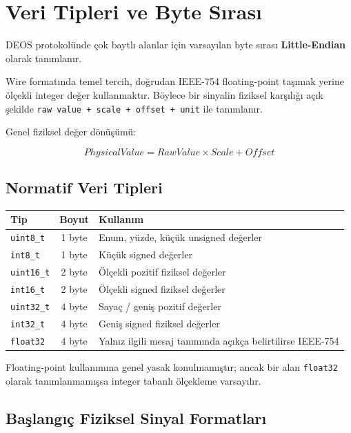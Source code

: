 \documentclass[a4paper,10pt]{article}
\newcommand{\code}[1]{\texttt{#1}}
\begin{document}
\section{Veri Tipleri ve Byte Sırası}

DEOS protokolünde çok baytlı alanlar için varsayılan byte sırası \textbf{Little-Endian}
olarak tanımlanır.

Wire formatında temel tercih, doğrudan IEEE-754 floating-point taşımak yerine ölçekli
integer değer kullanmaktır. Böylece bir sinyalin fiziksel karşılığı açık şekilde
\code{raw value + scale + offset + unit} ile tanımlanır.

Genel fiziksel değer dönüşümü:

\[
PhysicalValue = RawValue \times Scale + Offset
\]

\subsection{Normatif Veri Tipleri}

\begin{center}
\begin{tabularx}{\textwidth}{l c X}
\toprule
Tip & Boyut & Kullanım \\
\midrule
\code{uint8\_t}  & 1 byte & Enum, yüzde, küçük unsigned değerler \\
\code{int8\_t}   & 1 byte & Küçük signed değerler \\
\code{uint16\_t} & 2 byte & Ölçekli pozitif fiziksel değerler \\
\code{int16\_t}  & 2 byte & Ölçekli signed fiziksel değerler \\
\code{uint32\_t} & 4 byte & Sayaç / geniş pozitif değerler \\
\code{int32\_t}  & 4 byte & Geniş signed fiziksel değerler \\
\code{float32}   & 4 byte & Yalnız ilgili mesaj tanımında açıkça belirtilirse IEEE-754 \\
\bottomrule
\end{tabularx}
\end{center}

Floating-point kullanımına genel yasak konulmamıştır; ancak bir alan \code{float32}
olarak tanımlanmamışsa integer tabanlı ölçekleme varsayılır.

\subsection{Başlangıç Fiziksel Sinyal Formatları}
\end{document}
